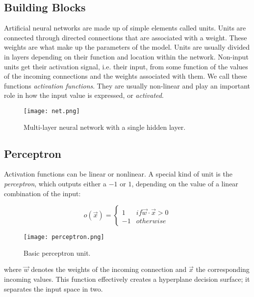 \subsection{Building Blocks}
Artificial neural networks are made up of simple elements called units.
Units are connected through directed connections
that are associated with a weight.
These weights are what make up the parameters of the model.
Units are usually divided in layers depending on their function
and location within the network.
Non-input units get their activation signal, i.e. their input,
from some function of the values of the incoming connections
and the weights associated with them.
We call these functions \textit{activation functions}.
They are usually non-linear and play an important role
in how the input value is expressed, or \textit{activated}.

\begin{figure}[h]
\label{fig.neuralnet}
\center
\texttt{[image: net.png]}
\caption{Multi-layer neural network with a single hidden layer.}
\end{figure}


\subsection{Perceptron}
Activation functions can be linear or nonlinear.
A special kind of unit is the \textit{perceptron},
which outputs either a $-1$ or $1$,
depending on the value of a linear combination of the input:

\begin{equation}
\label{eq.perceptron}
o(\overrightarrow{x}) = \begin{cases}
1 & if \overrightarrow{w}\cdot\overrightarrow{x} > 0 \\
-1 & otherwise
\end{cases}
\end{equation}

\begin{figure}
\label{fig.ml.perceptron}
\center
\texttt{[image: perceptron.png]}
\caption{Basic perceptron unit.}
\end{figure}

where $\overrightarrow{w}$ denotes the weights of the incoming connection
and $\overrightarrow{x}$ the corresponding incoming values.
This function effectively creates a hyperplane decision surface;
it separates the input space in two.

